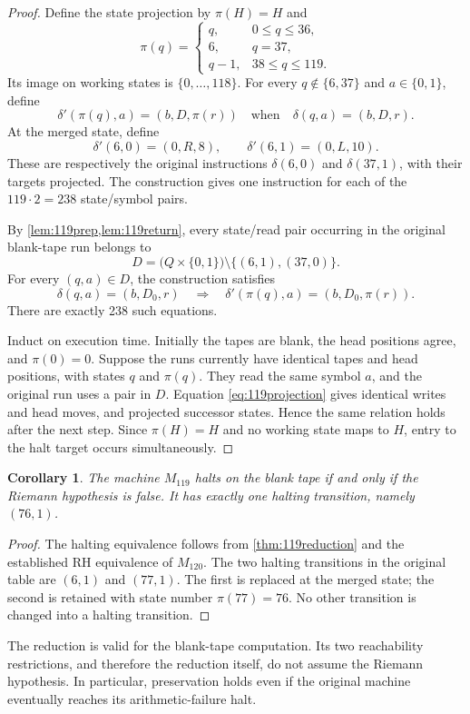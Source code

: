 \documentclass[11pt]{article}
\newtheorem{corollary}[theorem]{Corollary}
\begin{document}
\begin{proof}
Define the state projection by $\pi(H)=H$ and
\[
 \pi(q)=
 \begin{cases}
 q,&0\le q\le36,\\
 6,&q=37,\\
 q-1,&38\le q\le119.
 \end{cases}
\]
Its image on working states is $\{0,\ldots,118\}$.
For every $q\notin\{6,37\}$ and $a\in\{0,1\}$, define
\[
 \delta'(\pi(q),a)=(b,D,\pi(r))
 \quad\text{when}\quad\delta(q,a)=(b,D,r).
\]
At the merged state, define
\[
 \boxed{\delta'(6,0)=(0,R,8),\qquad
        \delta'(6,1)=(0,L,10).}
\]
These are respectively the original instructions
$\delta(6,0)$ and $\delta(37,1)$, with their targets projected.
The construction gives one instruction for each of the
$119\cdot2=238$ state/symbol pairs.

By \cref{lem:119prep,lem:119return}, every state/read pair occurring
in the original blank-tape run belongs to
\[
 D=\bigl(Q\times\{0,1\}\bigr)
       \setminus\{(6,1),(37,0)\}.
\]
For every $(q,a)\in D$, the construction satisfies
\begin{equation}
\label{eq:119projection}
 \delta(q,a)=(b,D_0,r)
 \quad\Longrightarrow\quad
 \delta'(\pi(q),a)=(b,D_0,\pi(r)).
\end{equation}
There are exactly 238 such equations.

Induct on execution time. Initially the tapes are blank, the head
positions agree, and $\pi(0)=0$. Suppose the runs currently have
identical tapes and head positions, with states $q$ and $\pi(q)$.
They read the same symbol $a$, and the original run uses a pair in $D$.
Equation \eqref{eq:119projection} gives identical writes and head
moves, and projected successor states. Hence the same relation holds
after the next step. Since $\pi(H)=H$ and no working state maps to $H$,
entry to the halt target occurs simultaneously.
\end{proof}

\begin{corollary}
\label{cor:119rh}
The machine $M_{119}$ halts on the blank tape if and only if the
Riemann hypothesis is false. It has exactly one halting transition,
namely $(76,1)$.
\end{corollary}

\begin{proof}
The halting equivalence follows from \cref{thm:119reduction} and the
established RH equivalence of $M_{120}$.
The two halting transitions in the original table are $(6,1)$ and
$(77,1)$. The first is replaced at the merged state; the second is
retained with state number $\pi(77)=76$. No other transition is
changed into a halting transition.
\end{proof}

The reduction is valid for the blank-tape computation. Its two
reachability restrictions, and therefore the reduction itself, do not
assume the Riemann hypothesis. In particular, preservation holds even
if the original machine eventually reaches its arithmetic-failure halt.
\end{document}
